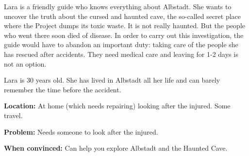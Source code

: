 \begin{npcBox}[title=Lara]
    \begin{consequences}
    \item {}
    \item {}
    \item {}
    \end{consequences}

    \begin{npcDescription}
    Lara is a friendly guide who knows everything about Albstadt. She wants to uncover the truth about the cursed and haunted cave, the so-called secret place where the Project dumps its toxic waste. It is not really haunted. But the people who went there soon died of disease.
    In order to carry out this investigation, the guide would have to abandon an important duty: taking care of the people she has rescued after accidents. They need medical care and leaving for 1-2 days is not an option.

    Lara is 30 years old. She has lived in Albstadt all her life and can barely remember the time before the accident.

    \textbf{Location:} At home (which needs repairing) looking after the injured. Some travel.

    \textbf{Problem:} Needs someone to look after the injured.

    \textbf{When convinced:} Can help you explore Albstadt and the Haunted Cave.
    \end{npcDescription}

\end{npcBox}

\newpage

